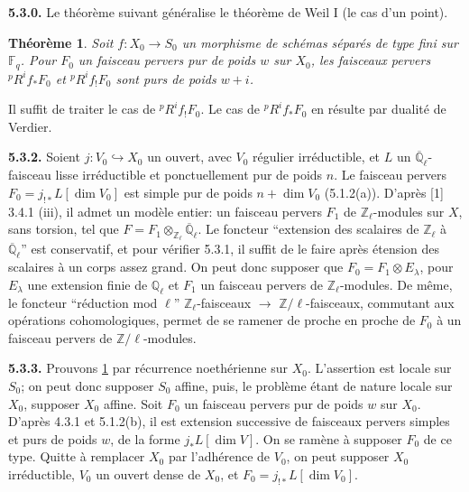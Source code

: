 \documentclass[12pt,a4paper]{article}
\theoremstyle{plain}
\newtheorem{theorem}{Th\'{e}or\`{e}me}[section]
\theoremstyle{definition}
\newcommand{\into}{\hookrightarrow}
\begin{document}
\noindent\textbf{5.3.0.} Le th\'{e}or\`{e}me suivant g\'{e}n\'{e}ralise le th\'{e}or\`{e}me de Weil I (le cas d'un point).

\begin{theorem}\label{thm:5.3.1}
Soit $f: X_{0} \to S_{0}$ un morphisme de sch\'{e}mas s\'{e}par\'{e}s de type fini sur $\mathbb{F}_{q}$. Pour $F_{0}$ un faisceau pervers pur de poids $w$ sur $X_{0}$, les faisceaux pervers ${}^{p}R^{i}f_{*}F_{0}$ et ${}^{p}R^{i}f_{!}F_{0}$ sont purs de poids $w+i$.
\end{theorem}

Il suffit de traiter le cas de ${}^{p}R^{i}f_{!}F_{0}$. Le cas de ${}^{p}R^{i}f_{*}F_{0}$ en r\'{e}sulte par dualit\'{e} de Verdier.

\noindent\textbf{5.3.2.} Soient $j: V_{0} \into X_{0}$ un ouvert, avec $V_{0}$ r\'{e}gulier irr\'{e}ductible, et $L$ un $\overline{\mathbb{Q}}_{\ell}$-faisceau lisse irr\'{e}ductible et ponctuellement pur de poids $n$. Le faisceau pervers $F_{0} = j_{!*}L[\dim V_{0}]$ est simple pur de poids $n + \dim V_{0}$ (5.1.2(a)). D'apr\`{e}s [1] 3.4.1 (iii), il admet un mod\`{e}le entier: un faisceau pervers $F_{1}$ de $\mathbb{Z}_{\ell}$-modules sur $X$, sans torsion, tel que $F = F_{1} \otimes_{\mathbb{Z}_{\ell}} \overline{\mathbb{Q}}_{\ell}$. Le foncteur ``extension des scalaires de $\mathbb{Z}_{\ell}$ \`{a} $\overline{\mathbb{Q}}_{\ell}$'' est conservatif, et pour v\'{e}rifier 5.3.1, il suffit de le faire apr\`{e}s \'{e}tension des scalaires \`{a} un corps assez grand. On peut donc supposer que $F_{0} = F_{1} \otimes E_{\lambda}$, pour $E_{\lambda}$ une extension finie de $\mathbb{Q}_{\ell}$ et $F_{1}$ un faisceau pervers de $\mathbb{Z}_{\ell}$-modules. De m\^{e}me, le foncteur ``r\'{e}duction mod $\ell$'' $\mathbb{Z}_{\ell}$-faisceaux $\to$ $\mathbb{Z}/\ell$-faisceaux, commutant aux op\'{e}rations cohomologiques, permet de se ramener de proche en proche de $F_{0}$ \`{a} un faisceau pervers de $\mathbb{Z}/\ell$-modules.

\noindent\textbf{5.3.3.} Prouvons \ref{thm:5.3.1} par r\'{e}currence noeth\'{e}rienne sur $X_{0}$. L'assertion est locale sur $S_{0}$; on peut donc supposer $S_{0}$ affine, puis, le probl\`{e}me \'{e}tant de nature locale sur $X_{0}$, supposer $X_{0}$ affine. Soit $F_{0}$ un faisceau pervers pur de poids $w$ sur $X_{0}$. D'apr\`{e}s 4.3.1 et 5.1.2(b), il est extension successive de faisceaux pervers simples et purs de poids $w$, de la forme $j_{*}L[\dim V]$. On se ram\`{e}ne \`{a} supposer $F_{0}$ de ce type. Quitte \`{a} remplacer $X_{0}$ par l'adh\'{e}rence de $V_{0}$, on peut supposer $X_{0}$ irr\'{e}ductible, $V_{0}$ un ouvert dense de $X_{0}$, et $F_{0} = j_{!*}L[\dim V_{0}]$.
\end{document}
